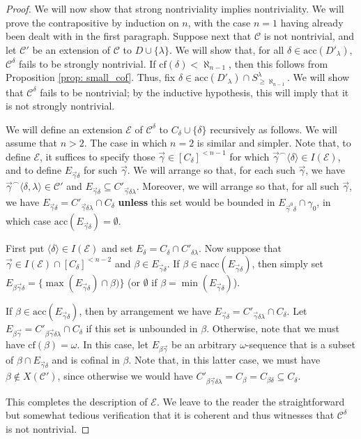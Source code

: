 \documentclass{amsart}
\numberwithin{theorem}{section}
\theoremstyle{definition}
\newcommand{\cf}{\mathrm{cf}}
\newcommand{\nacc}{\mathrm{nacc}}
\newcommand{\acc}{\mathrm{acc}}
\newcommand{\mc}{\mathcal}
\begin{document}
\begin{proof}
  We will now show that strong nontriviality implies nontriviality. We will prove the contrapositive by induction on $n$, with the case $n=1$ having already been dealt with in the first paragraph. Suppose next that $\mc{C}$ is not nontrivial, and let $\mc{C}'$ be an extension of $\mc{C}$ to $D \cup \{\lambda\}$. We will show that, 
  for all $\delta \in \acc(D'_\lambda)$, $\mc{C}^\delta$ fails to be 
  strongly nontrivial. If $\cf(\delta) < \aleph_{n-1}$, then this follows 
  from Proposition \ref{prop: small_cof}. Thus, fix $\delta \in 
  \acc(D'_\lambda) \cap S^\lambda_{\geq \aleph_{n-1}}$. We will show that 
  $\mc{C}^\delta$ fails to be nontrivial; by the inductive hypothesis, this 
  will imply that it is not strongly nontrivial.
  
  We will define an extension $\mc{E}$ of $\mc{C}^\delta$ to 
  $C_\delta \cup \{\delta\}$ recursively as follows. We will assume 
  that $n > 2$. The case in which $n = 2$ is similar and simpler. Note that, 
  to define $\mc{E}$, it suffices to specify those $\vec{\gamma} 
  \in [C_\delta]^{{<}n-1}$ for which $\vec{\gamma}^\frown \langle \delta 
  \rangle \in I(\mc{E})$, and to define $E_{\vec{\gamma}\delta}$ for such 
  $\vec{\gamma}$. We will arrange so that, for each such $\vec{\gamma}$, 
  we have $\vec{\gamma}^\frown \langle \delta, \lambda \rangle \in 
  \mc{C}'$ and $E_{\vec{\gamma}\delta} \subseteq C'_{\vec{\gamma}\delta\lambda}$.
  Moreover, we will arrange so that, for all such $\vec{\gamma}$, 
  we have $E_{\vec{\gamma}\delta} = C'_{\vec{\gamma}\delta\lambda} \cap 
  C_\delta$ \textbf{unless} this set would be bounded in $E_{\vec{\gamma}^0\delta} 
  \cap \gamma_0$, in which case $\acc(E_{\vec{\gamma}\delta}) = \emptyset$.
  
  
  First put $\langle \delta \rangle \in I(\mc{E})$ and 
  set $E_\delta = C_\delta \cap C'_{\delta\lambda}$. Now suppose that 
  $\vec{\gamma} \in I(\mc{E}) \cap [C_\delta]^{{<}n-2}$ and 
  $\beta \in E_{\vec{\gamma}\delta}$. If $\beta \in \nacc(E_{\vec{\gamma}\delta})$, 
  then simply set $E_{\beta\vec{\gamma}\delta} = \{\max(E_{\vec{\gamma}\delta}) 
  \cap \beta)\}$ (or $\emptyset$ if $\beta = \min(E_{\vec{\gamma}\delta})$).
  
  If $\beta \in \acc(E_{\vec{\gamma}\delta})$, then by arrangement we have 
  $E_{\vec{\gamma}\delta} = C'_{\vec{\gamma}\delta\lambda} \cap C_\delta$. 
  Let $E_{\beta\vec{\gamma}} = C'_{\beta\vec{\gamma}\delta\lambda} \cap 
  C_\delta$ if this set is unbounded in $\beta$. Otherwise, note that we 
  must have $\cf(\beta) = \omega$. In this case, let 
  $E_{\beta\vec{\gamma}}$ be an arbitrary $\omega$-sequence that is a subset 
  of $\beta \cap E_{\vec{\gamma}\delta}$ and is cofinal in $\beta$. Note that, 
  in this latter case, we must have $\beta \notin X(\mc{C'})$, since otherwise 
  we would have $C'_{\beta\vec{\gamma}\delta\lambda} = C_\beta = C_{\beta\delta} 
  \subseteq C_\delta$.
  
  This completes the description of $\mc{E}$. We leave to the reader the 
  straightforward but somewhat tedious verification that it is coherent and 
  thus witnesses that $\mc{C}^\delta$ is not nontrivial.
\end{proof}
\end{document}

